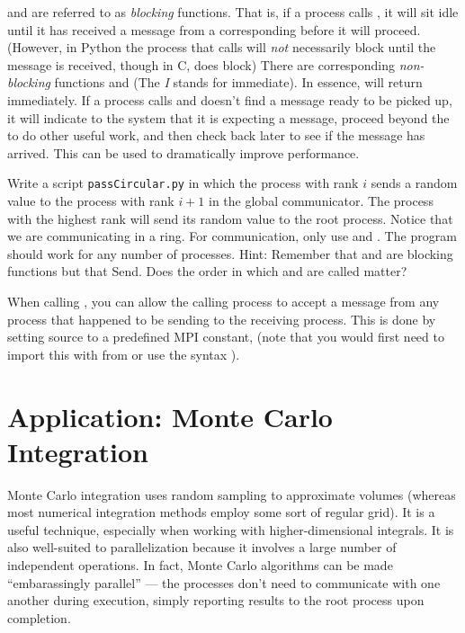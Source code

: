 \begin{info}
 and  are referred to as \emph{blocking} functions. 
That is, if a process calls , it will sit idle until it has received a message from a corresponding  before it will proceed.
(However, in Python the process that calls  will \emph{not} necessarily block until the message is received, though in C,  does block) 
There are corresponding \emph{non-blocking} functions  and  (The \emph{I} stands for immediate). 
In essence,  will return immediately. 
If a process calls  and doesn't find a message ready to be picked up, it will indicate to the system that it is expecting a message, proceed beyond the  to do other useful work, and then check back later to see if the message has arrived. 
This can be used to dramatically improve performance.
\end{info}

\begin{problem}
Write a script \texttt{passCircular.py} in which the process with rank $i$ sends a random value to the process with rank $i+1$ in the global communicator. 
The process with the highest rank will send its random value to the root process. 
Notice that we are communicating in a ring. 
For communication, only use  and . 
The program should work for any number of processes. 
Hint: Remember that  and  are blocking functions but that Send. 
Does the order in which  and  are called matter?
\end{problem}

\begin{info}
When calling , you can allow the calling process to accept a message from any process that happened to be sending to the receiving process. 
This is done by setting source to a predefined MPI constant,  (note that you would first need to import this with from  or use the syntax ).
\end{info}

\section*{Application: Monte Carlo Integration}
Monte Carlo integration uses random sampling to approximate volumes (whereas most numerical integration methods employ some sort of regular grid). 
It is a useful technique, especially when working with higher-dimensional integrals. 
It is also well-suited to parallelization because it involves a large number of independent operations. 
In fact, Monte Carlo algorithms can be made ``embarassingly parallel'' --- the processes don't need to communicate with one another during execution, simply reporting results to the root process upon completion.


